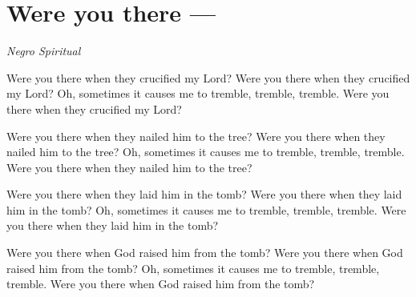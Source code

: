 \starttocol
\chapter{Were you there ---}
\nexttocol
\hfill{\it Negro Spiritual}
\stoptocol

\startlines
{\sc Were} you there when they crucified my Lord?
Were you there when they crucified my Lord?
Oh, sometimes it causes me to tremble, tremble, tremble.
Were you there when they crucified my Lord?

Were you there when they nailed him to the tree?
Were you there when they nailed him to the tree?
Oh, sometimes it causes me to tremble, tremble, tremble.
Were you there when they nailed him to the tree?

Were you there when they laid him in the tomb?
Were you there when they laid him in the tomb?
Oh, sometimes it causes me to tremble, tremble, tremble.
Were you there when they laid him in the tomb?

Were you there when God raised him from the tomb?
Were you there when God raised him from the tomb?
Oh, sometimes it causes me to tremble, tremble, tremble.
Were you there when God raised him from the tomb?
\stoplines



